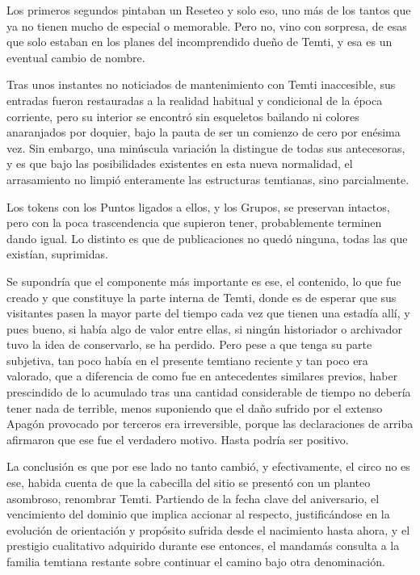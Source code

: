\documentclass[
]{book}
\begin{document}
Los primeros segundos pintaban un Reseteo y solo eso, uno más de los tantos que ya no tienen mucho de especial o memorable. Pero no, vino con sorpresa, de esas que solo estaban en los planes del incomprendido dueño de Temti, y esa es un eventual cambio de nombre.

Tras unos instantes no noticiados de mantenimiento con Temti inaccesible, sus entradas fueron restauradas a la realidad habitual y condicional de la época corriente, pero su interior se encontró sin esqueletos bailando ni colores anaranjados por doquier, bajo la pauta de ser un comienzo de cero por enésima vez. Sin embargo, una minúscula variación la distingue de todas sus antecesoras, y es que bajo las posibilidades existentes en esta nueva normalidad, el arrasamiento no limpió enteramente las estructuras temtianas, sino parcialmente.

Los tokens con los Puntos ligados a ellos, y los Grupos, se preservan intactos, pero con la poca trascendencia que supieron tener, probablemente terminen dando igual. Lo distinto es que de publicaciones no quedó ninguna, todas las que existían, suprimidas.

Se supondría que el componente más importante es ese, el contenido, lo que fue creado y que constituye la parte interna de Temti, donde es de esperar que sus visitantes pasen la mayor parte del tiempo cada vez que tienen una estadía allí, y pues bueno, si había algo de valor entre ellas, si ningún historiador o archivador tuvo la idea de conservarlo, se ha perdido. Pero pese a que tenga su parte subjetiva, tan poco había en el presente temtiano reciente y tan poco era valorado, que a diferencia de como fue en antecedentes similares previos, haber prescindido de lo acumulado tras una cantidad considerable de tiempo no debería tener nada de terrible, menos suponiendo que el daño sufrido por el extenso Apagón provocado por terceros era irreversible, porque las declaraciones de arriba afirmaron que ese fue el verdadero motivo. Hasta podría ser positivo.

La conclusión es que por ese lado no tanto cambió, y efectivamente, el circo no es ese, habida cuenta de que la cabecilla del sitio se presentó con un planteo asombroso, renombrar Temti. Partiendo de la fecha clave del aniversario, el vencimiento del dominio que implica accionar al respecto, justificándose en la evolución de orientación y propósito sufrida desde el nacimiento hasta ahora, y el prestigio cualitativo adquirido durante ese entonces, el mandamás consulta a la familia temtiana restante sobre continuar el camino bajo otra denominación.
\end{document}
